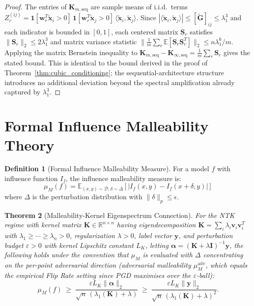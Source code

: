 \documentclass{article}
\theoremstyle{plain}
\newtheorem{theorem}{Theorem}[section]
\theoremstyle{definition}
\newtheorem{definition}[theorem]{Definition}
\theoremstyle{remark}
\newcommand{\R}{\mathbb{R}}
\newcommand{\E}{\mathbb{E}}
\begin{document}
\begin{proof}
The entries of $\mathbf{K}_{m,\text{seq}}$ are sample means of i.i.d.\ terms $Z_r^{(ij)} = \mathbf{1}[\mathbf{w}_r^T\tilde{\mathbf{x}}_i > 0]\,\mathbf{1}[\mathbf{w}_r^T\tilde{\mathbf{x}}_j > 0]\,\langle\tilde{\mathbf{x}}_i,\tilde{\mathbf{x}}_j\rangle$. Since $|\langle\tilde{\mathbf{x}}_i,\tilde{\mathbf{x}}_j\rangle| \leq [\tilde{\mathbf{G}}]_{ij} \leq \lambda_1^3$ and each indicator is bounded in $[0,1]$, each centered matrix $\mathbf{S}_r$ satisfies $\|\mathbf{S}_r\|_2 \leq 2\lambda_1^3$ and matrix variance statistic $\|\frac{1}{m}\sum_r \E[\mathbf{S}_r\mathbf{S}_r^T]\|_2 \leq n\lambda_1^6/m$. Applying the matrix Bernstein inequality \citep{tropp2012user} to $\mathbf{K}_{m,\text{seq}} - \mathbf{K}_{\infty,\text{seq}} = \frac{1}{m}\sum_r \mathbf{S}_r$ gives the stated bound. This is identical to the bound derived in the proof of Theorem~\ref{thm:cubic_conditioning}; the sequential-architecture structure introduces no additional deviation beyond the spectral amplification already captured by $\lambda_1^3$.
\end{proof}

\section{Formal Influence Malleability Theory}
\label{app:malleability}

\begin{definition}[Formal Influence Malleability Measure]
For a model $f$ with influence function $I_f$, the influence malleability measure is:
$$\mu_M(f) = \E_{(x,y)\sim\mathcal{D}, \delta\sim\Delta} \left[|I_f(x,y) - I_f(x+\delta,y)|\right]$$
where $\Delta$ is the perturbation distribution with $\|\delta\|_p \leq \epsilon$.
\end{definition}

\begin{theorem}[Malleability-Kernel Eigenspectrum Connection]
\label{thm:malleability_eigenspectrum}
For the NTK regime with kernel matrix $\mathbf{K} \in \R^{n\times n}$ having eigendecomposition $\mathbf{K} = \sum_i \lambda_i \mathbf{v}_i\mathbf{v}_i^T$ with $\lambda_1 \geq \cdots \geq \lambda_n > 0$, regularization $\lambda > 0$, label vector $\mathbf{y}$, and perturbation budget $\varepsilon > 0$ with kernel Lipschitz constant $L_K$, letting $\boldsymbol{\alpha} = (\mathbf{K}+\lambda\mathbf{I})^{-1}\mathbf{y}$, the following holds under the convention that $\mu_M$ is evaluated with $\Delta$ concentrating on the per-point adversarial direction (adversarial malleability $\mu_M^{\mathrm{adv}}$, which equals the empirical Flip Rate setting since PGD maximises over the $\varepsilon$-ball):
$$\mu_M(f) \;\geq\; \frac{\varepsilon L_K \|\boldsymbol{\alpha}\|_2}{\sqrt{n}\,(\lambda_1(\mathbf{K}) + \lambda)} \;\geq\; \frac{\varepsilon L_K \|\mathbf{y}\|_2}{\sqrt{n}\,(\lambda_1(\mathbf{K}) + \lambda)^2}.$$
\end{theorem}
\end{document}
